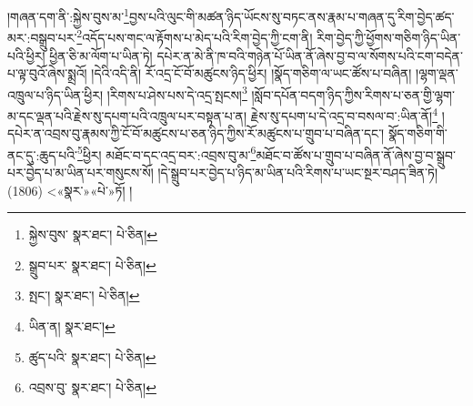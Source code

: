 །གཞན་དག་ནི་:སྐྱེས་བུས་མ་\footnote{སྐྱེས་བུས་  སྣར་ཐང་།  པེ་ཅིན། }བྱས་པའི་ལུང་གི་མཚན་ཉིད་ཡོངས་སུ་བཏང་ནས་རྣམ་པ་གཞན་དུ་རིག་བྱེད་ཚད་མར་:བསྒྲུབ་པར་\footnote{སྒྲུབ་པར་  སྣར་ཐང་།  པེ་ཅིན། }འདོད་པས་གང་ལ་རྟོགས་པ་མེད་པའི་རིག་བྱེད་ཀྱི་ངག་ནི། རིག་བྱེད་ཀྱི་ཕྱོགས་གཅིག་ཉིད་ཡིན་པའི་ཕྱིར། ཕྱིན་ཅི་མ་ལོག་པ་ཡིན་ཏེ། དཔེར་ན་མེ་ནི་ཁ་བའི་གཉེན་པོ་ཡིན་ནོ་ཞེས་བྱ་བ་ལ་སོགས་པའི་ངག་བདེན་པ་ལྟ་བུའོ་ཞེས་སྨྲའོ། །དེའི་འདི་ནི། རོ་འདྲ་ངོ་བོ་མཚུངས་ཉིད་ཕྱིར། །སྣོད་གཅིག་ལ་ཡང་ཚོས་པ་བཞིན། །ལྷག་ལྡན་འཁྲུལ་པ་ཉིད་ཡིན་ཕྱིར། །རིགས་པ་ཤེས་པས་དེ་འདྲ་སྤངས།\footnote{སྤང་།  སྣར་ཐང་།  པེ་ཅིན། } །སློབ་དཔོན་བདག་ཉིད་ཀྱིས་རིགས་པ་ཅན་གྱི་ལྷག་མ་དང་ལྡན་པའི་རྗེས་སུ་དཔག་པའི་འཁྲུལ་པར་བསྟན་པ་ན། རྗེས་སུ་དཔག་པ་དེ་འདྲ་བ་བསལ་བ་:ཡིན་ནོ།\footnote{ཡིན་ན།  སྣར་ཐང་། } །དཔེར་ན་འབྲས་བུ་རྣམས་ཀྱི་ངོ་བོ་མཚུངས་པ་ཅན་ཉིད་ཀྱིས་རོ་མཚུངས་པ་གྲུབ་པ་བཞིན་དང་། སྣོད་གཅིག་གི་ནང་དུ་:ཆུད་པའི་\footnote{ཚུད་པའི་  སྣར་ཐང་།  པེ་ཅིན། }ཕྱིར། མཐོང་བ་དང་འདྲ་བར་:འབྲས་བུ་མ་\footnote{འབྲས་བུ་  སྣར་ཐང་།  པེ་ཅིན། }མཐོང་བ་ཚོས་པ་གྲུབ་པ་བཞིན་ནོ་ཞེས་བྱ་བ་སྒྲུབ་པར་བྱེད་པ་མ་ཡིན་པར་གསུངས་སོ། །དེ་སྒྲུབ་པར་བྱེད་པ་ཉིད་མ་ཡིན་པའི་རིགས་པ་ཡང་སྔར་བཤད་ཟིན་ཏེ། (1806) <«སྣར་»«པེ་»ཏོ། །
